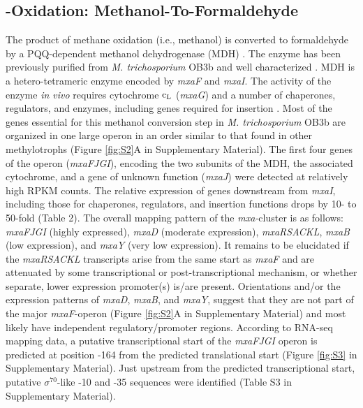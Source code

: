 \subsection{-Oxidation: Methanol-To-Formaldehyde}
The product of methane oxidation (i.e., methanol) is converted to formaldehyde by a PQQ-dependent methanol dehydrogenase (MDH) \cite{anthony1982, anthony2002, yamada1992, anthony1994}. %
The enzyme has been previously purified from \textit{M. trichosporium} OB3b and well characterized \cite{yamada1992}.  %
MDH is a hetero-tetrameric enzyme encoded by \textit{mxaF} and \textit{mxaI}.
The activity of the enzyme \textit{in vivo} requires cytochrome {${\text c_{\text L}}$} (\textit{mxaG}) and a number of chaperones, regulators, and enzymes, including genes required for  insertion \cite{anthony1994, anthony2002}.
Most of the genes essential for this methanol conversion step in \textit{M. trichosporium} OB3b are organized in one large operon in an order similar to that found in other methylotrophs (Figure \ref{fig:S2}A in Supplementary Material).
The first four genes of the operon (\textit{mxaFJGI}), encoding the two subunits of the MDH, the associated cytochrome, and a gene of unknown function (\textit{mxaJ}) were detected at relatively high RPKM counts.
The relative expression of genes downstream from \textit{mxaI}, including those for chaperones, regulators, and  insertion functions drops by 10- to 50-fold (Table 2).
The overall mapping pattern of the \textit{mxa-}cluster is as follows: \textit{mxaFJGI} (highly expressed), \textit{mxaD} (moderate expression), \textit{mxaRSACKL}, \textit{mxaB} (low expression), and \textit{mxaY} (very low expression).
It remains to be elucidated if the \textit{mxaRSACKL} transcripts arise from the same start as \textit{mxaF} and are attenuated by some transcriptional or post-transcriptional mechanism, or whether separate, lower expression promoter(s) is/are present.
Orientations and/or the expression patterns of \textit{mxaD}, \textit{mxaB}, and \textit{mxaY}, suggest that they are not part of the major \textit{mxaF}-operon (Figure \ref{fig:S2}A in Supplementary Material) and most likely have independent regulatory/promoter regions.
According to RNA-seq mapping data, a putative transcriptional start of the \textit{mxaFJGI} operon is predicted at position -164 from the predicted translational start (Figure \ref{fig:S3} in Supplementary Material).
Just upstream from the predicted transcriptional start, putative $\sigma^{70}$-like -10 and -35 sequences were identified (Table S3 in Supplementary Material).

